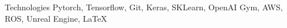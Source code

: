 \cvskill
  {Technologies}
    {Pytorch, Tensorflow, Git, Keras, SKLearn, OpenAI Gym, AWS, ROS, Unreal Engine, LaTeX}
